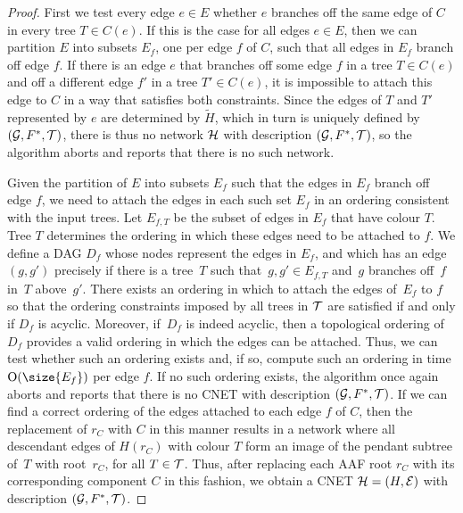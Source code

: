 \begin{proof}
  First we test every edge $e \in E$ whether $e$ branches off the same edge of $C$ in every tree {$T\in C(e)$}.   If this is the case for all edges $e \in E$, then we can partition $E$ into   subsets $E_f$, one per edge $f$ of $C$, such that all edges in $E_f$ branch   off edge $f$.   If there is an edge $e$ that branches off some edge $f$ in a tree $T \in C(e)$   and off a different edge $f'$ in a tree $T' \in C(e)$, it is impossible to   attach this edge to $C$ in a way that satisfies both constraints.   Since the edges of $T$ and $T'$ represented by $e$ are determined by   $\tilde H$,   which in turn is uniquely defined by $(\mathcal{G}, F^*, \mathcal{T})$, there is thus no network   $\mathcal{H}$ with description $(\mathcal{G}, F^*, \mathcal{T})$, so the algorithm aborts and reports   that there is no such network. 

  Given the partition of $E$ into subsets $E_f$ such that the edges in $E_f$   branch off edge $f$, we need to attach the edges in each such set $E_f$   in an ordering consistent with the input trees.   Let $E_{f,T}$ be the subset of edges in $E_f$ that have colour $T$.   Tree $T$ determines the ordering in which these edges need to be attached to   $f$. We define a DAG $D_f$ whose nodes represent the edges in $E_f$, and {which has an edge~$(g,g')$ precisely if there is a tree~$T$ such that~$g,g'\in E_{f,T}$ and~$g$ branches off~$f$ in~$T$ above~$g'$.}   There exists an ordering in which to attach {the edges of~$E_f$} to $f$ so that   the ordering constraints imposed by all trees in $\mathcal{T}$ are satisfied if and   only if $D_f$ is acyclic. {Moreover, if~$D_f$ is indeed acyclic, then a topological ordering of $D_f$ provides a valid ordering in which the edges can be attached.}   Thus, we can test whether such an ordering exists and, if so, compute such   an ordering in time $\Oh(\size{E_f})$ per edge $f$.   If no such ordering exists, the algorithm once again aborts and reports that   there is no CNET with description $(\mathcal{G}, F^*, \mathcal{T})$.   If we can find a correct ordering of the edges attached to each edge $f$   of $C$, then the replacement of $r_C$ with $C$ in this manner results in   a network where all descendant edges of $H(r_C)$ with colour $T$ form   an image of {the pendant subtree of~$T$ with root~$r_C$}, for all $T \in \mathcal{T}$.   Thus, after replacing each AAF root $r_C$ with its corresponding component   $C$ in this fashion, we obtain a CNET $\mathcal{H} = (H, \mathcal{E})$ with   description $(\mathcal{G}, F^*, \mathcal{T})$.
\end{proof}


